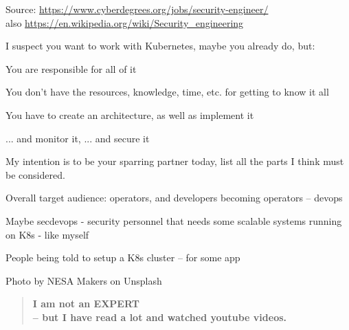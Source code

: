 \documentclass[Screen16to9,17pt]{foils}
\begin{document}
Source: \url{https://www.cyberdegrees.org/jobs/security-engineer/}\\
also
\url{https://en.wikipedia.org/wiki/Security_engineering}





I suspect you want to work with Kubernetes, maybe you already do, but:
\begin{list2}
\item You are responsible for all of it
\item You don't have the resources, knowledge, time, etc. for getting to know it all
\item You have to create an architecture, as well as implement it
\item ... and monitor it, ... and secure it
\end{list2}
My intention is to be your sparring partner today, list all the parts I think must be considered.



\begin{quote}

\end{quote}

\begin{list2}
\item Overall target audience: operators, and developers becoming operators -- devops
\item Maybe secdevops - security personnel that needs some scalable systems running on K8s
    - like myself
\item People being told to setup a K8s cluster -- for some app
\end{list2}
\hfill {\small Photo by NESA Makers on Unsplash}


\begin{quote}
\large \bf I am not an EXPERT \\
-- but I have read a lot and watched youtube videos. \smiley
\end{quote}
\end{document}
